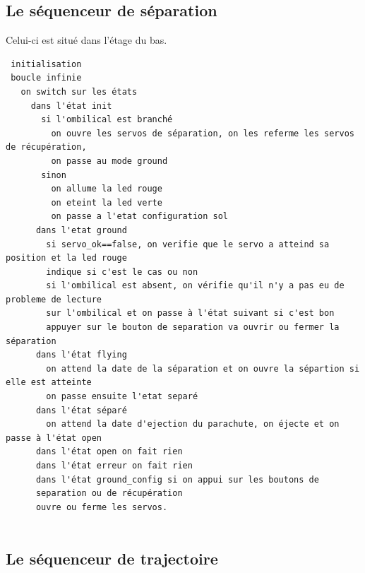 \documentclass{article}
\begin{document}
\subsection*{Le séquenceur de séparation}
Celui-ci est situé dans l'étage du bas.
\begin{verbatim}
 initialisation
 boucle infinie
   on switch sur les états
     dans l'état init
       si l'ombilical est branché
         on ouvre les servos de séparation, on les referme les servos de récupération,
         on passe au mode ground
       sinon
         on allume la led rouge
         on eteint la led verte
         on passe a l'etat configuration sol
      dans l'etat ground
        si servo_ok==false, on verifie que le servo a atteind sa position et la led rouge
        indique si c'est le cas ou non
        si l'ombilical est absent, on vérifie qu'il n'y a pas eu de probleme de lecture 
        sur l'ombilical et on passe à l'état suivant si c'est bon
        appuyer sur le bouton de separation va ouvrir ou fermer la séparation
      dans l'état flying
        on attend la date de la séparation et on ouvre la sépartion si elle est atteinte
        on passe ensuite l'etat separé
      dans l'état séparé
        on attend la date d'ejection du parachute, on éjecte et on passe à l'état open
      dans l'état open on fait rien
      dans l'état erreur on fait rien
      dans l'état ground_config si on appui sur les boutons de 
      separation ou de récupération
      ouvre ou ferme les servos.
      
\end{verbatim}

\subsection*{Le séquenceur de trajectoire}
\end{document}
